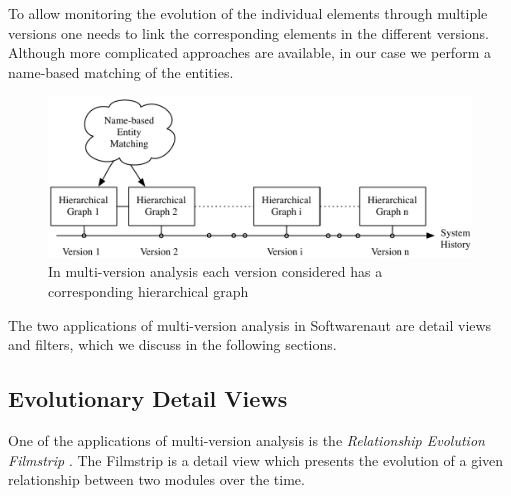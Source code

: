 \documentclass[preprint,12pt]{elsarticle}
\begin{document}
To allow monitoring the evolution of the individual elements through multiple versions one needs to link the corresponding elements in the different versions. Although more complicated approaches are available, in our case we perform a name-based matching of the entities.

\begin{figure}[ht]
\begin{center}
\includegraphics[width=\linewidth]{images/MultiVersionAnalysis}
\caption{In multi-version analysis each version considered has a corresponding hierarchical graph}
\end{center}
\end{figure}

The two applications of multi-version analysis in Softwarenaut are detail views and filters, which we discuss in the following sections.

\subsection {Evolutionary Detail Views}

One of the applications of multi-version analysis is the {\em Relationship Evolution Filmstrip} \cite{lungu-relevo}. The Filmstrip is a detail view which presents the evolution of a given relationship between two modules over the time. %
\end{document}
